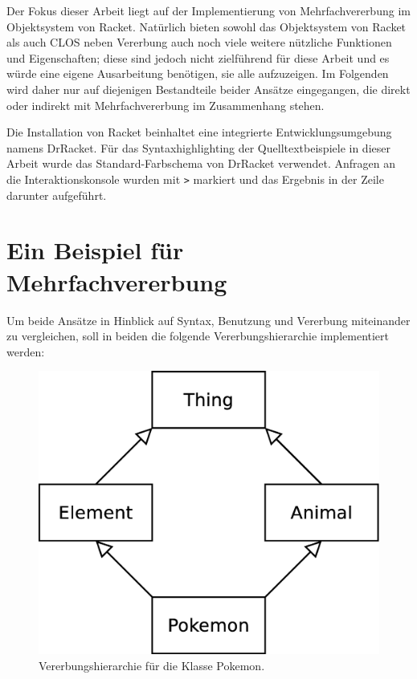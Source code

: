 Der Fokus dieser Arbeit liegt auf der Implementierung von Mehrfachvererbung im Objektsystem von Racket. Natürlich bieten sowohl das Objektsystem von Racket als auch CLOS neben Vererbung auch noch viele weitere nützliche Funktionen und Eigenschaften; diese sind jedoch nicht zielführend für diese Arbeit und es würde eine eigene Ausarbeitung benötigen, sie alle aufzuzeigen. Im Folgenden wird daher nur auf diejenigen Bestandteile beider Ansätze eingegangen, die direkt oder indirekt mit Mehrfachvererbung im Zusammenhang stehen. 

Die Installation von Racket beinhaltet eine integrierte Entwicklungsumgebung namens DrRacket. Für das Syntaxhighlighting der Quelltextbeispiele in dieser Arbeit wurde das Standard-Farbschema von DrRacket verwendet. Anfragen an die Interaktionskonsole wurden mit \texttt{>} markiert und das Ergebnis in der Zeile darunter aufgeführt. 

\section{Ein Beispiel für Mehrfachvererbung} 

Um beide Ansätze in Hinblick auf Syntax, Benutzung und Vererbung miteinander zu vergleichen, soll in beiden die folgende Vererbungshierarchie implementiert werden:

\begin{figure}[h]
 \centering
 \includegraphics[scale=0.27]{pictures/pokemon}
 \caption{Vererbungshierarchie für die Klasse Pokemon.}
 \label{pokemon}
\end{figure}

